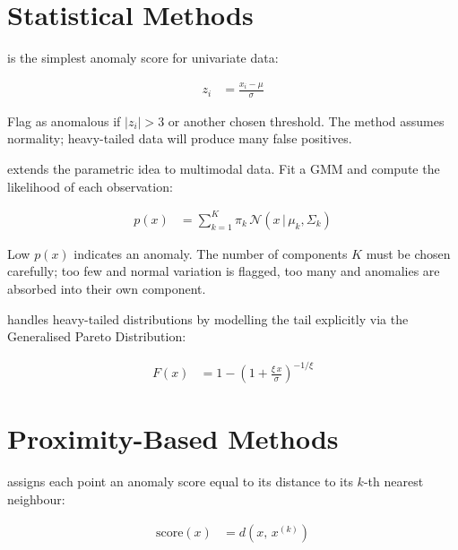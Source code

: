 \section{Statistical Methods}


 is the simplest anomaly score for univariate data:

\begin{align*}
    z_i &= \frac{x_i - \mu}{\sigma}
\end{align*}

Flag as anomalous if $|z_i| > 3$ or another chosen threshold.
The method assumes normality; heavy-tailed data will produce many false positives.

 extends the parametric idea to multimodal data.
Fit a GMM and compute the likelihood of each observation:

\begin{align*}
    p(x) &= \sum_{k=1}^K \pi_k\, \mathcal{N}(x \,|\, \mu_k, \Sigma_k)
\end{align*}

Low $p(x)$ indicates an anomaly.
The number of components $K$ must be chosen carefully; too few and normal variation is flagged, too many and anomalies are absorbed into their own component.

 handles heavy-tailed distributions by modelling the tail explicitly via the Generalised Pareto Distribution:

\begin{align*}
    F(x) &= 1 - \left(1 + \frac{\xi\, x}{\sigma}\right)^{-1/\xi}
\end{align*}


\section{Proximity-Based Methods}


 assigns each point an anomaly score equal to its distance to its $k$-th nearest neighbour:

\begin{align*}
    \text{score}(x) &= d(x,\, x^{(k)})
\end{align*}

